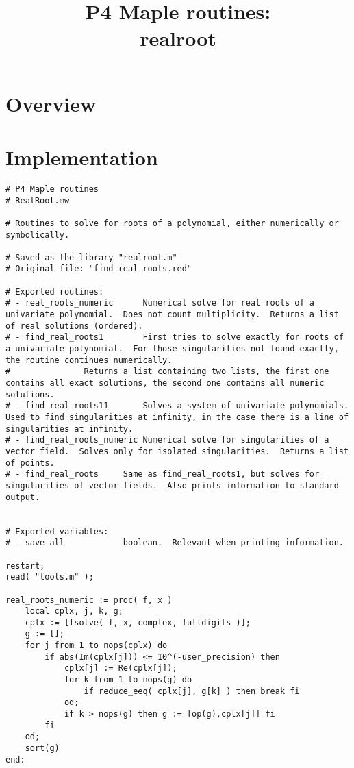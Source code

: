 \documentclass[a4paper,10pt]{article}
\title{P4 Maple routines:\\realroot}
\author{}
\date{}
\begin{document}
\maketitle

\section{Overview}

\section{Implementation}

\begin{lstlisting}[name=realroot]
# P4 Maple routines
# RealRoot.mw

# Routines to solve for roots of a polynomial, either numerically or symbolically.

# Saved as the library "realroot.m"
# Original file: "find_real_roots.red"

# Exported routines:
# - real_roots_numeric      Numerical solve for real roots of a univariate polynomial.  Does not count multiplicity.  Returns a list of real solutions (ordered).
# - find_real_roots1        First tries to solve exactly for roots of a univariate polynomial.  For those singularities not found exactly, the routine continues numerically.
#               Returns a list containing two lists, the first one contains all exact solutions, the second one contains all numeric solutions.
# - find_real_roots11       Solves a system of univariate polynomials.  Used to find singularities at infinity, in the case there is a line of singularities at infinity.
# - find_real_roots_numeric Numerical solve for singularities of a vector field.  Solves only for isolated singularities.  Returns a list of points.
# - find_real_roots     Same as find_real_roots1, but solves for singularities of vector fields.  Also prints information to standard output.


# Exported variables:
# - save_all            boolean.  Relevant when printing information.

restart;
read( "tools.m" );

real_roots_numeric := proc( f, x )
    local cplx, j, k, g;
    cplx := [fsolve( f, x, complex, fulldigits )];
    g := [];
    for j from 1 to nops(cplx) do
        if abs(Im(cplx[j])) <= 10^(-user_precision) then
            cplx[j] := Re(cplx[j]);
            for k from 1 to nops(g) do
                if reduce_eeq( cplx[j], g[k] ) then break fi
            od;
            if k > nops(g) then g := [op(g),cplx[j]] fi
        fi
    od;
    sort(g)
end:


\end{lstlisting}
\end{document}
